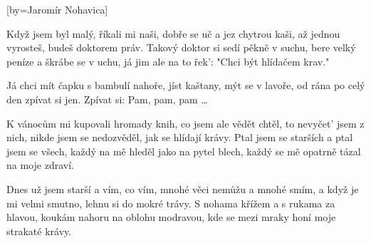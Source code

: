 [by={Jaromír Nohavica}]

\beginverse{}
Když jsem byl malý, říkali mi naši,
dobře se uč a jez chytrou kaši,
až jednou vyrosteš, budeš doktorem práv.
Takový doktor si sedí pěkně v suchu,
bere velký peníze a škrábe se v uchu,
já jim ale na to řek': "Chci být hlídačem krav."
\endverse{}

\beginchorus{}
Já chci mít čapku s bambulí nahoře,
jíst kaštany, mýt se v lavoře,
od rána po celý den zpívat si jen.
Zpívat si: Pam, pam, pam \ldots{}
\endchorus{}

\beginverse{}
K vánocům mi kupovali hromady knih,
co jsem ale vědět chtěl, to nevyčet' jsem z nich,
nikde jsem se nedozvěděl, jak se hlídají krávy.
Ptal jsem se starších a ptal jsem se všech,
každý na mě hleděl jako na pytel blech,
každý se mě opatrně tázal na moje zdraví.
\endverse{}

\beginchorus{}

\endchorus{}

\beginverse{}
Dnes už jsem starší a vím, co vím,
mnohé věci nemůžu a mnohé smím,
a když je mi velmi smutno, lehnu si do mokré trávy.
S nohama křížem a s rukama za hlavou,
koukám nahoru na oblohu modravou,
kde se mezi mraky honí moje strakaté krávy.
\endverse{}

\beginchorus{}

\endchorus{}

\endsong{}
